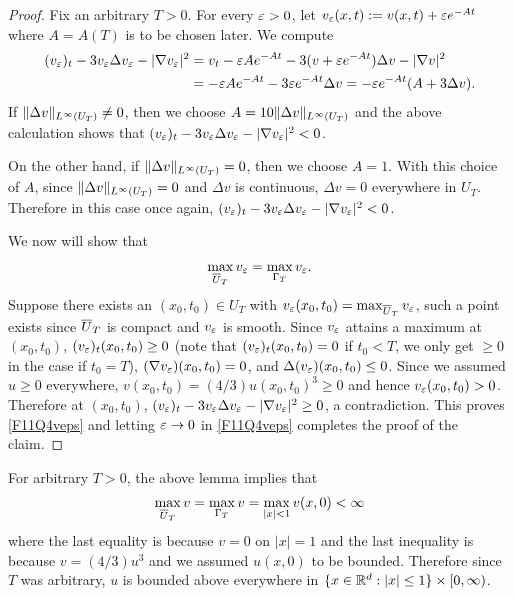 \begin{proof}
Fix an arbitrary $T > 0$. For every $\varepsilon > 0$, let $v_{\varepsilon}(x, t) := v(x, t) + \varepsilon e^{-At}$ where $A = A(T)$ is to be chosen later.
We compute
\begin{align*}
(v_{\varepsilon})_{t} - 3v_{\varepsilon}\Delta v_{\varepsilon} - |\nabla v_{\varepsilon}|^{2}&= v_{t} - \varepsilon Ae^{-At} - 3(v + \varepsilon e^{-At})\Delta v - |\nabla v|^{2}\\
& = -\varepsilon Ae^{-At} - 3\varepsilon e^{-At}\Delta v = -\varepsilon e^{-At}(A + 3\Delta v).
\end{align*}
If $\| \Delta v \|_{L^{\infty}(U_{T})} \neq 0$, then we choose $A = 10\| \Delta v \|_{L^{\infty}(U_{T})}$ and the above calculation shows that
$(v_{\varepsilon})_{t} - 3v_{\varepsilon}\Delta v_{\varepsilon} - |\nabla v_{\varepsilon}|^{2} < 0$.

On the other hand, if $\| \Delta v \|_{L^{\infty}(U_{T})} = 0$, then we choose $A = 1$. With this choice of $A$, since $\| \Delta v \|_{L^{\infty}(U_{T})} = 0$
and $\Delta v$ is continuous, $\Delta v = 0$ everywhere in $U_{T}$. Therefore in this case once again, $(v_{\varepsilon})_{t} - 3v_{\varepsilon}\Delta v_{\varepsilon} - |\nabla v_{\varepsilon}|^{2} < 0$.

We now will show that
\begin{align}\label{F11Q4veps}
\max_{\overline{U}_{T}}v_{\varepsilon} = \max_{\Gamma_{T}}v_{\varepsilon}.
\end{align}
Suppose there exists an $(x_{0}, t_{0}) \in U_{T}$
with $v_{\varepsilon}(x_{0}, t_{0}) = \max_{\overline{U}_{T}}v_{\varepsilon}$, such a point exists since $\overline{U}_{T}$ is compact and $v_{\varepsilon}$ is smooth.
Since $v_{\varepsilon}$
attains a maximum at $(x_{0}, t_{0})$, $(v_{\varepsilon})_{t}(x_{0}, t_{0}) \geq 0$ (note that $(v_{\varepsilon})_{t}(x_{0}, t_{0}) = 0$ if $t_{0} < T$, we only get
$\geq 0$ in the case if $t_{0} = T$), $(\nabla v_{\varepsilon})(x_{0}, t_{0}) = 0$, and $\Delta(v_{\varepsilon})(x_{0}, t_{0}) \leq 0$.
Since we assumed $u \geq 0$ everywhere, $v(x_{0}, t_{0}) = (4/3)u(x_{0}, t_{0})^{3}\geq 0$ and hence $v_{\varepsilon}(x_{0}, t_{0}) > 0$.
Therefore at $(x_{0}, t_{0})$, $(v_{\varepsilon})_{t} - 3v_{\varepsilon}\Delta v_{\varepsilon} - |\nabla v_{\varepsilon}|^{2} \geq 0$, a contradiction.
This proves \eqref{F11Q4veps} and letting $\varepsilon \rightarrow 0$ in \eqref{F11Q4veps} completes the proof of the claim.
\end{proof}
For arbitrary $T > 0$, the above lemma implies that
\begin{align*}
\max_{\overline{U}_{T}}v = \max_{\Gamma_{T}}v = \max_{|x| < 1}v(x, 0) < \infty
\end{align*}
where the last equality is because $v = 0$ on $|x| = 1$ and the last inequality is because $v = (4/3)u^{3}$ and we assumed $u(x, 0)$ to be bounded.
Therefore since $T$ was arbitrary, $u$ is bounded above everywhere in $\{x \in \mathbb{R}^{d}: |x| \leq 1\} \times [0, \infty)$.

